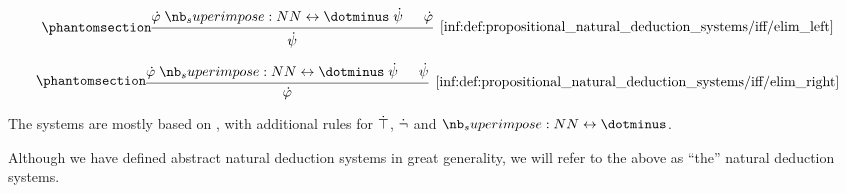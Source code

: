 \begin{definition}
\begin{thmenum}
\begin{paracol}{3}
      \begin{nthcolumn}{1}
        \begin{equation*}\taglabel[\ensuremath{ \leftrightarrow^{-L} }]{inf:def:propositional_natural_deduction_systems/iff/elim_left}
          \begin{prooftree}
            \hypo{ \syn\varphi \syniff \syn\psi }
            \hypo{ \syn\varphi }
            \infer2[\ref{inf:def:propositional_natural_deduction_systems/iff/elim_left}]{ \syn\psi }
          \end{prooftree}
        \end{equation*}
      \end{nthcolumn}

      \begin{nthcolumn}{2}
        \begin{equation*}\taglabel[\ensuremath{ \leftrightarrow^{-R} }]{inf:def:propositional_natural_deduction_systems/iff/elim_right}
          \begin{prooftree}
            \hypo{ \syn\varphi \syniff \syn\psi }
            \hypo{ \syn\psi }
            \infer2[\ref{inf:def:propositional_natural_deduction_systems/iff/elim_right}]{ \syn\varphi }
          \end{prooftree}
        \end{equation*}
      \end{nthcolumn}
    \end{paracol}
  \end{thmenum}
\end{definition}
\begin{comments}
  \item The systems are mostly based on \cite[def. 2.1.1]{TroelstraSchwichtenberg2000Proofs}, with additional rules for \( \dot{\top} \), \( \dot{\neg} \) and \( \syniff \).
  \item Although we have defined abstract natural deduction systems in great generality, we will refer to the above as \enquote{the} natural deduction systems.
\end{comments}

